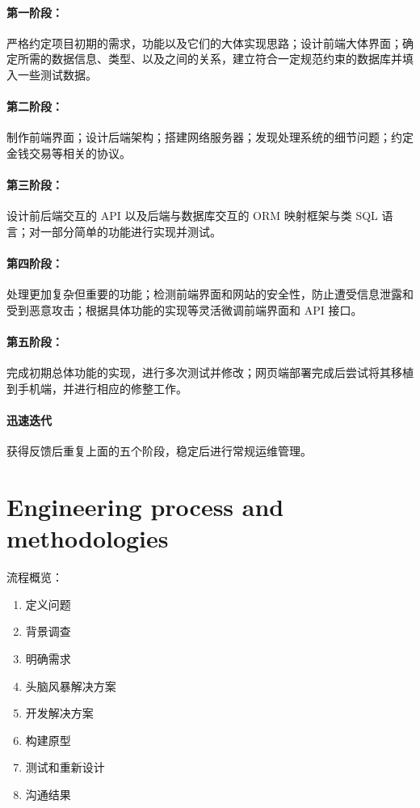\documentclass[cn,black,10pt,normal]{elegantnote}
\begin{document}
\paragraph{第一阶段：}严格约定项目初期的需求，功能以及它们的大体实现思路；设计前端大体界面；确定所需的数据信息、类型、以及之间的关系，建立符合一定规范约束的数据库并填入一些测试数据。

\paragraph{第二阶段：}制作前端界面；设计后端架构；搭建网络服务器；发现处理系统的细节问题；约定金钱交易等相关的协议。

\paragraph{第三阶段：}设计前后端交互的 API 以及后端与数据库交互的 ORM 映射框架与类 SQL 语言；对一部分简单的功能进行实现并测试。

\paragraph{第四阶段：}处理更加复杂但重要的功能；检测前端界面和网站的安全性，防止遭受信息泄露和受到恶意攻击；根据具体功能的实现等灵活微调前端界面和 API 接口。

\paragraph{第五阶段：}完成初期总体功能的实现，进行多次测试并修改；网页端部署完成后尝试将其移植到手机端，并进行相应的修整工作。

\paragraph{迅速迭代} 获得反馈后重复上面的五个阶段，稳定后进行常规运维管理。


\section{Engineering process and methodologies}

流程概览：
\begin{enumerate}
    \item 定义问题
    \item 背景调查
    \item 明确需求
    \item 头脑风暴解决方案
    \item 开发解决方案
    \item 构建原型
    \item 测试和重新设计
    \item 沟通结果
\end{enumerate}
\end{document}
